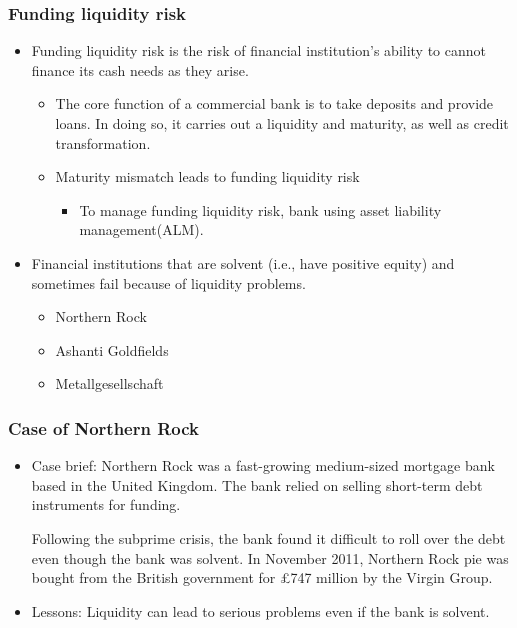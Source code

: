 \subsubsection{Funding liquidity risk}
\begin{itemize}
    \item Funding liquidity risk is the risk of financial institution's ability to cannot finance its cash needs as they arise.
        \begin{itemize}
        \item The core function of a commercial bank is to take deposits and provide loans. In doing so, it carries out a liquidity and maturity, as well as credit transformation.
        \item Maturity mismatch leads to funding liquidity risk
            \begin{itemize}
            \item To manage funding liquidity risk, bank using asset liability management(ALM).
            \end{itemize}

        \end{itemize}
    \item Financial institutions that are solvent (i.e., have positive equity) and sometimes fail because of liquidity problems.
        \begin{itemize}
        \item Northern Rock
        \item Ashanti Goldfields
        \item Metallgesellschaft
        \end{itemize}
\end{itemize}



\subsubsection{Case of Northern Rock}
\begin{itemize}
    \item Case brief: Northern Rock was a fast-growing medium-sized mortgage bank based in the United Kingdom. The bank relied on selling short-term debt instruments for funding.
    
    Following the subprime crisis, the bank found it difficult to roll over the debt even though the bank was solvent. In November 2011, Northern Rock pie was bought from the British government for £747 million by the Virgin Group.
    \item Lessons: Liquidity can lead to serious problems even if the bank is solvent.
\end{itemize}



